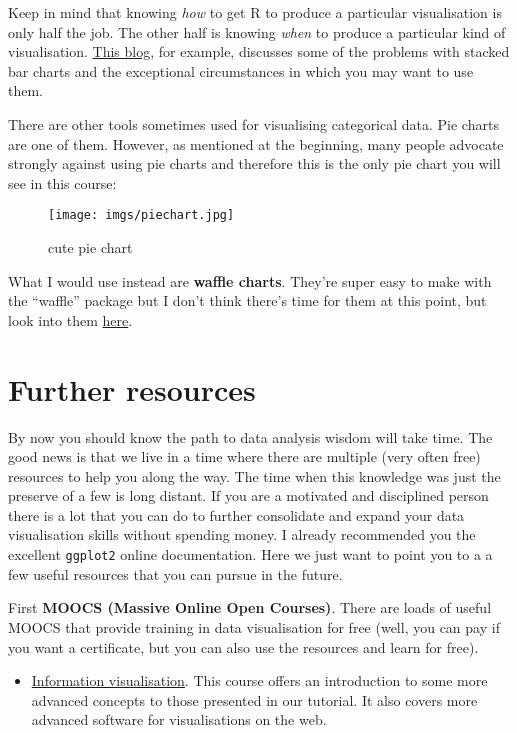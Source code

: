 \documentclass[
]{book}
\providecommand{\tightlist}{%
  \setlength{\itemsep}{0pt}\setlength{\parskip}{0pt}}
\begin{document}
Keep in mind that knowing \emph{how} to get R to produce a particular visualisation is only half the job. The other half is knowing \emph{when} to produce a particular kind of visualisation. \href{https://solomonmg.github.io/post/when-to-use-stacked-barcharts/}{This blog}, for example, discusses some of the problems with stacked bar charts and the exceptional circumstances in which you may want to use them.

There are other tools sometimes used for visualising categorical data. Pie charts are one of them. However, as mentioned at the beginning, many people advocate strongly against using pie charts and therefore this is the only pie chart you will see in this course:

\begin{figure}
\centering
\texttt{[image: imgs/piechart.jpg]}
\caption{cute pie chart}
\end{figure}

What I would use instead are \textbf{waffle charts}. They're super easy to make with the ``waffle'' package but I don't think there's time for them at this point, but look into them \href{https://www.r-bloggers.com/making-waffle-charts-in-r-with-the-new-waffle-package/}{here}.

\section{Further resources}\label{further-resources}

By now you should know the path to data analysis wisdom will take time. The good news is that we live in a time where there are multiple (very often free) resources to help you along the way. The time when this knowledge was just the preserve of a few is long distant. If you are a motivated and disciplined person there is a lot that you can do to further consolidate and expand your data visualisation skills without spending money. I already recommended you the excellent \texttt{ggplot2} online documentation. Here we just want to point you to a a few useful resources that you can pursue in the future.

First \textbf{MOOCS (Massive Online Open Courses)}. There are loads of useful MOOCS that provide training in data visualisation for free (well, you can pay if you want a certificate, but you can also use the resources and learn for free).

\begin{itemize}
\tightlist
\item
  \href{https://www.coursera.org/specializations/information-visualization}{Information visualisation}. This course offers an introduction to some more advanced concepts to those presented in our tutorial. It also covers more advanced software for visualisations on the web.
\end{itemize}
\end{document}
